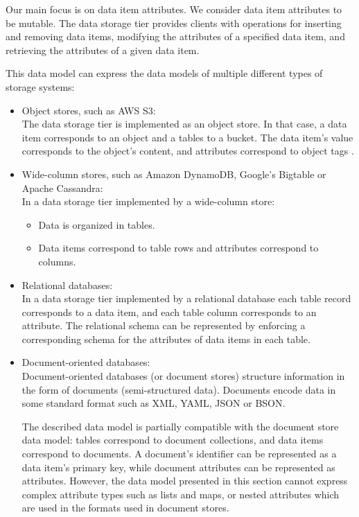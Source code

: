 Our main focus is on data item attributes.
We consider data item attributes to be mutable.
The data storage tier provides clients with operations for inserting and removing data items,
modifying the attributes of a specified data item, and retrieving the attributes of a given data item.


This data model can express the data models of multiple different types of storage systems:
\begin{itemize}
  \item Object stores, such as AWS S3: \\
  The data storage tier is implemented as an object store.
  In that case, a data item corresponds to an object and a tables to a bucket.
  The data item's value corresponds to the object's content,
  and attributes correspond to object tags \cite{awss3:tagging}.

  \item Wide-column stores, such as Amazon DynamoDB, Google's Bigtable or Apache Cassandra: \\
  In a data storage tier implemented by a wide-column store:
  \begin{itemize}
    \item Data is organized in tables.
    \item Data items correspond to table rows and attributes correspond to columns.
  \end{itemize}

  \item Relational databases: \\
  In a data storage tier implemented by a relational database each table record corresponds to a data item, and each
  table column corresponds to an attribute.
  The relational schema can be represented by enforcing a corresponding schema for the attributes of data items in each
  table.

  \item Document-oriented databases: \\
  Document-oriented databases (or document stores) structure information in the form of documents (semi-structured data).
  Documents encode data in some standard format such as XML, YAML, JSON or BSON.

  The described data model is partially compatible with the document store data model:
  tables correspond to document collections, and data items correspond to documents.
  A document's identifier can be represented as a data item's primary key, while document attributes can be represented
  as attributes.
  However, the data model presented in this section cannot express complex attribute types such as lists and maps,
  or nested attributes which are used in the formats used in document stores.


\end{itemize}
